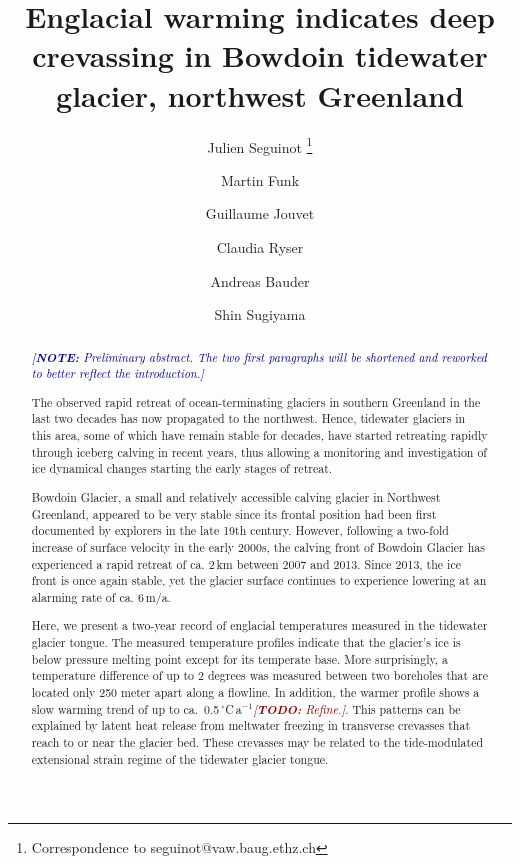 \documentclass{article}
\title{Englacial warming indicates deep crevassing in Bowdoin tidewater
       glacier, northwest Greenland}
\author[1]{Julien Seguinot
           \thanks{Correspondence to seguinot@vaw.baug.ethz.ch}}
\author[1]{Martin Funk}
\author[1]{Guillaume Jouvet}
\author[1]{Claudia Ryser}
\author[1]{Andreas Bauder}
\author[2]{Shin Sugiyama}
\affil[1]{Laboratory of Hydraulics, Hydrology and Glaciology,
          ETH Zürich, Switzerland}
\affil[2]{Institute of Low Temperature Science,
          Hokkaido University, Sapporo, Japan}
\newcommand{\note}[1]{\textcolor{darkblue}{\emph{[\textbf{NOTE:} #1]}}}
\newcommand{\todo}[1]{\textcolor{darkred}{\emph{[\textbf{TODO:} #1]}}}
\begin{document}

\maketitle

\begin{abstract}

    \note{Preliminary abstract. The two first paragraphs will be shortened and
          reworked to better reflect the introduction.}

    The observed rapid retreat of ocean-terminating glaciers in southern
    Greenland in the last two decades has now propagated to the northwest.
    Hence, tidewater glaciers in this area, some of which have remain stable
    for decades, have started retreating rapidly through iceberg calving in
    recent years, thus allowing a monitoring and investigation of ice dynamical
    changes starting the early stages of retreat.

    Bowdoin Glacier, a small and relatively accessible calving glacier in
    Northwest Greenland, appeared to be very stable since its frontal position
    had been first documented by explorers in the late 19th century. However,
    following a two-fold increase of surface velocity in the early 2000s, the
    calving front of Bowdoin Glacier has experienced a rapid retreat of ca.
    2\,km between 2007 and 2013. Since 2013, the ice front is once again
    stable, yet the glacier surface continues to experience lowering at an
    alarming rate of ca. 6\,m/a.

    Here, we present a two-year record of englacial temperatures measured in
    the tidewater glacier tongue. The measured temperature profiles indicate
    that the glacier's ice is below pressure melting point except for its
    temperate base. More surprisingly, a temperature difference of up to 2
    degrees was measured between two boreholes that are located only 250 meter
    apart along a flowline. In addition, the warmer profile shows a slow
    warming trend of up to ca.~0.5\,$^\circ$C\,a$^{-1}$\todo{Refine.}. This
    patterns can be explained by latent heat release from meltwater freezing in
    transverse crevasses that reach to or near the glacier bed. These crevasses
    may be related to the tide-modulated extensional strain regime of the
    tidewater glacier tongue.

\end{abstract}
\end{document}
